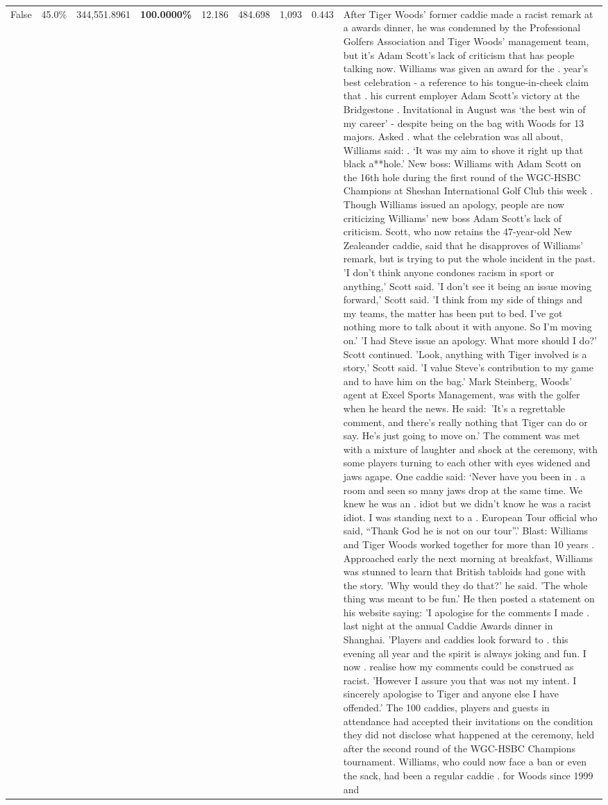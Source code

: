 \begin{table}[H]
\begin{tabular}{lllrlllll}
False & 45.0\% & 344,551.8961 & \bfseries \color{red} 100.0000\% & 12.186 & 484.698 & 1,093 & 0.443 & After Tiger Woods' former caddie made a racist remark at a awards dinner, he was condemned by the Professional Golfers Association and Tiger Woods' management team, but it's Adam Scott's lack of criticism that has people talking now. Williams was given an award for the . year’s best celebration - a reference to his tongue-in-cheek claim that . his current employer Adam Scott’s victory at the Bridgestone . Invitational in August was ‘the best win of my career’ - despite being on the bag with Woods for 13 majors. Asked . what the celebration was all about, Williams said: . ‘It was my aim to shove it right up that black a**hole.’ New boss: Williams with Adam Scott  on the 16th hole during the first round of the WGC-HSBC Champions at Sheshan International Golf Club this week . Though Williams issued an apology, people are now criticizing Williams' new boss Adam Scott's lack of criticism. Scott, who now retains the 47-year-old New Zealeander caddie, said that he disapproves of Williams' remark, but is trying to put the whole incident in the past. 'I don't think anyone condones racism in sport or anything,' Scott said. 'I don't see it being an issue moving forward,' Scott said. 'I think from my side of things and my teams, the matter has been put to bed. I've got nothing more to talk about it with anyone. So I'm moving on.' 'I had Steve issue an apology. What more should I do?' Scott continued. 'Look, anything with Tiger involved is a story,' Scott said. 'I value Steve's contribution to my game and to have him on the bag.' Mark Steinberg, Woods' agent at Excel Sports Management, was with the golfer when he heard the news. He said: 'It's a regrettable comment, and there's really nothing that Tiger can do or say. He's just going to move on.' The comment was met with a mixture of laughter and shock at the ceremony, with some players turning to each other with eyes widened and jaws agape. One caddie said: ‘Never have you been in . a room and seen so many jaws drop at the same time. We knew he was an . idiot but we didn’t know he was a racist idiot. I was standing next to a . European Tour official who said, “Thank God he is not on our tour”.’ Blast: Williams and Tiger Woods worked together for more than 10 years . Approached early the next morning at breakfast, Williams was stunned to learn that British tabloids had gone with the story. 'Why would they do that?' he said. 'The whole thing was meant to be fun.' He then posted a statement on his website saying: 'I apologise for the comments I made . last night at the annual Caddie Awards dinner in Shanghai. 'Players and caddies look forward to . this evening all year and the spirit is always joking and fun. I now . realise how my comments could be construed as racist. 'However I assure you that was not my intent. I sincerely apologise to Tiger and anyone else I have offended.' The 100 caddies, players and guests in attendance had accepted their invitations on the condition they did not disclose what happened at the ceremony, held after the second round of the WGC-HSBC Champions tournament. Williams, who could now face a ban or even the sack, had been a regular caddie . for Woods since 1999 and 
\end{tabular}
\end{table}
